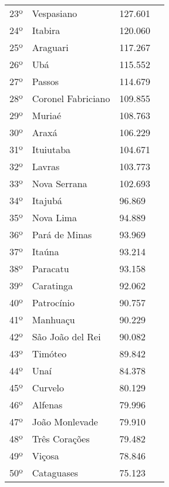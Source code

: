 \begin{table}[H]
\begin{tabular}{r|l|l|l}
		23º      & Vespasiano           & 127.601         \\
		24º      & Itabira              & 120.060         \\
		25º      & Araguari             & 117.267         \\
		26º      & Ubá                  & 115.552         \\
		27º      & Passos               & 114.679         \\
		28º      & Coronel Fabriciano   & 109.855         \\
		29º      & Muriaé               & 108.763         \\
		30º      & Araxá                & 106.229         \\
		31º      & Ituiutaba            & 104.671         \\
		32º      & Lavras               & 103.773         \\
		33º      & Nova Serrana         & 102.693         \\		
		34º      & Itajubá              & 96.869          \\
		35º      & Nova Lima            & 94.889          \\
		36º      & Pará de Minas        & 93.969          \\
		37º      & Itaúna               & 93.214          \\
		38º      & Paracatu             & 93.158          \\
		39º      & Caratinga            & 92.062          \\
		40º      & Patrocínio           & 90.757          \\
		41º      & Manhuaçu             & 90.229          \\
		42º      & São João del Rei     & 90.082          \\
		43º      & Timóteo              & 89.842          \\
		44º      & Unaí                 & 84.378          \\
		45º      & Curvelo              & 80.129          \\
		46º      & Alfenas              & 79.996          \\
		47º      & João Monlevade       & 79.910          \\
		48º      & Três Corações        & 79.482          \\
		49º      & Viçosa               & 78.846          \\
		50º      & Cataguases           & 75.123          \\ 
	\end{tabular}
\end{table}

